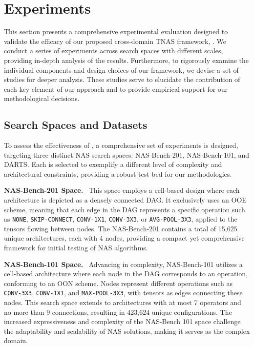 \documentclass[../main.tex]{subfiles}
\begin{document}
\section{Experiments}\label{sec:experiment}

This section presents a comprehensive experimental evaluation designed to validate the efficacy of our proposed cross-domain TNAS framework, \OUR{}.
We conduct a series of experiments across search spaces with different scales, providing in-depth analysis of the results.
Furthermore, to rigorously examine the individual components and design choices of our framework, we devise a set of studies for deeper analysis.
These studies serve to elucidate the contribution of each key element of our approach and to provide empirical support for our methodological decisions.

\subsection{Search Spaces and Datasets}

To assess the effectiveness of \OUR{}, a comprehensive set of experiments is designed, targeting three distinct NAS search spaces: NAS-Bench-201, NAS-Bench-101, and DARTS\@.
Each is selected to exemplify a different level of complexity and architectural constraints, providing a robust test bed for our methodologies.

\textbf{NAS-Bench-201 Space.}~\cite{DBLP:journals/pami/DongLMG22}\quad
This space employs a cell-based design where each architecture is depicted as a densely connected DAG\@.
It exclusively uses an OOE scheme, meaning that each edge in the DAG represents a specific operation
such as \texttt{NONE}, \texttt{SKIP-CONNECT}, \texttt{CONV-1X1}, \texttt{CONV-3X3},
or \texttt{AVG-POOL-3X3}, applied to the tensors flowing between nodes.
The NAS-Bench-201 contains a total of 15,625 unique architectures, each with 4 nodes, providing a compact yet comprehensive framework for initial testing of NAS algorithms.

\textbf{NAS-Bench-101 Space.}~\cite{DBLP:conf/icml/YingKCR0H19}\quad
Advancing in complexity, NAS-Bench-101 utilizes a cell-based architecture where each node in the DAG corresponds to an operation, conforming to an OON scheme.
Nodes represent different operations such as \texttt{CONV-3X3}, \texttt{CONV-1X1}, and \texttt{MAX-POOL-3X3}, with tensors as edges connecting these nodes.
This search space extends to architectures with at most 7 operators and no more than 9 connections, resulting in 423,624 unique configurations.
The increased expressiveness and complexity of the NAS-Bench 101 space challenge the adaptability and scalability of NAS solutions, making it serves as the complex domain.
\end{document}
